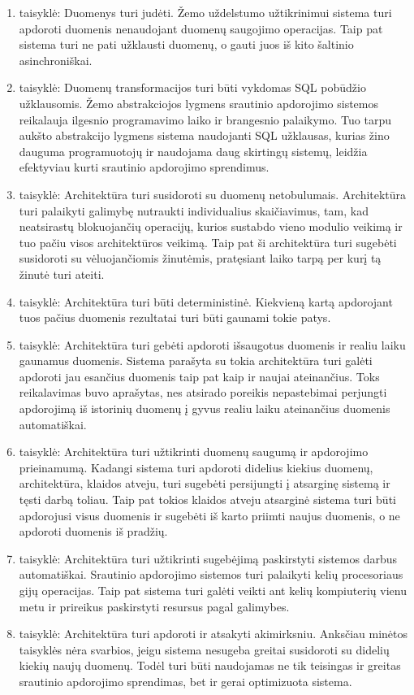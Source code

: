 \documentclass{VUMIFPSkursinis}
\begin{document}
\begin{enumerate}[label=\arabic*]
    \item taisyklė: Duomenys turi judėti. Žemo uždelstumo užtikrinimui sistema turi apdoroti duomenis nenaudojant duomenų saugojimo operacijas. 
    Taip pat sistema turi ne pati užklausti duomenų, o gauti juos iš kito šaltinio asinchroniškai. 
    \item taisyklė: Duomenų transformacijos turi būti vykdomas SQL pobūdžio užklausomis. Žemo abstrakciojos lygmens srautinio apdorojimo sistemos reikalauja ilgesnio 
    programavimo laiko ir brangesnio palaikymo. Tuo tarpu aukšto abstrakcijo lygmens sistema 
    naudojanti SQL užklausas, kurias žino dauguma programuotojų ir naudojama daug skirtingų sistemų, leidžia efektyviau kurti srautinio apdorojimo sprendimus.
    \item taisyklė: Architektūra turi susidoroti su duomenų netobulumais. Architektūra turi palaikyti galimybę nutraukti individualius skaičiavimus,
    tam, kad neatsirastų blokuojančių operacijų, kurios sustabdo vieno modulio veikimą ir tuo pačiu visos architektūros veikimą. Taip pat ši 
    architektūra turi sugebėti susidoroti su vėluojančiomis žinutėmis, pratęsiant laiko tarpą per kurį tą žinutė turi ateiti.
    \item taisyklė: Architektūra turi būti deterministinė. Kiekvieną kartą apdorojant tuos pačius duomenis rezultatai turi būti gaunami tokie patys.
    \item taisyklė: Architektūra turi gebėti apdoroti išsaugotus duomenis ir realiu laiku gaunamus duomenis. Sistema parašyta su tokia architektūra turi galėti apdoroti jau esančius duomenis taip pat kaip ir 
    naujai ateinančius. Toks reikalavimas buvo aprašytas, nes atsirado poreikis nepastebimai perjungti apdorojimą iš istorinių duomenų į gyvus realiu laiku ateinančius duomenis automatiškai.
    \item taisyklė: Architektūra turi užtikrinti duomenų saugumą ir apdorojimo prieinamumą. Kadangi sistema turi apdoroti didelius kiekius duomenų, architektūra, klaidos atveju, turi sugebėti persijungti į atsarginę
    sistemą ir tęsti darbą toliau. Taip pat tokios klaidos atveju atsarginė sistema turi būti apdorojusi visus duomenis ir sugebėti iš karto priimti naujus duomenis, o ne apdoroti duomenis iš pradžių.
    \item taisyklė: Architektūra turi užtikrinti sugebėjimą paskirstyti sistemos darbus automatiškai. Srautinio apdorojimo sistemos turi palaikyti kelių procesoriaus gijų operacijas. Taip pat sistema turi galėti 
    veikti ant kelių kompiuterių vienu metu ir prireikus paskirstyti resursus pagal galimybes.
    \item taisyklė: Architektūra turi apdoroti ir atsakyti akimirksniu. Anksčiau minėtos taisyklės nėra svarbios, jeigu sistema nesugeba greitai susidoroti su didelių kiekių naujų duomenų. 
    Todėl turi būti naudojamas ne tik teisingas ir greitas srautinio apdorojimo sprendimas, bet ir gerai optimizuota sistema.
\end{enumerate}\par 
\end{document}
